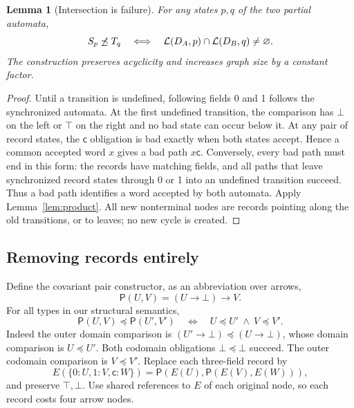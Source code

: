 \documentclass[11pt,letterpaper]{article}
\newtheorem{lemma}[theorem]{Lemma}
\theoremstyle{definition}\newtheorem{definition}[theorem]{Definition}
\newcommand{\Sub}{\ensuremath{\preceq}}
\newcommand{\rec}[1]{\{#1\}}
\newcommand{\checkfield}{\mathsf c}
\begin{document}
\begin{lemma}[Intersection is failure]\label{lem:encoding}
For any states $p,q$ of the two partial automata,
\[
 S_p\not\Sub T_q\quad\Longleftrightarrow\quad
 \mathcal L(D_A,p)\cap\mathcal L(D_B,q)\ne\varnothing.
\]
The construction preserves acyclicity and increases graph size by a constant factor.
\end{lemma}
\begin{proof}
Until a transition is undefined, following fields 0 and 1 follows the synchronized automata. At the first undefined transition, the comparison has $\bot$ on the left or $\top$ on the right and no bad state can occur below it. At any pair of record states, the $\checkfield$ obligation is bad exactly when both states accept. Hence a common accepted word $x$ gives a bad path $x\checkfield$. Conversely, every bad path must end in this form: the records have matching fields, and all paths that leave synchronized record states through 0 or 1 into an undefined transition succeed. Thus a bad path identifies a word accepted by both automata. Apply Lemma~\ref{lem:product}. All new nonterminal nodes are records pointing along the old transitions, or to leaves; no new cycle is created.
\end{proof}

\subsection{Removing records entirely}
Define the covariant pair constructor, as an abbreviation over arrows,
\[
 \mathsf P(U,V)=(U\to\bot)\to V.
\]
For all types in our structural semantics,
\begin{equation}\label{eq:pair}
 \mathsf P(U,V)\Sub\mathsf P(U',V')
 \quad\Longleftrightarrow\quad U\Sub U'\ \land\ V\Sub V'.
\end{equation}
Indeed the outer domain comparison is $(U'\to\bot)\Sub(U\to\bot)$, whose domain comparison is $U\Sub U'$. Both codomain obligations $\bot\Sub\bot$ succeed. The outer codomain comparison is $V\Sub V'$.
Replace each three-field record by
\[
 E(\rec{0:U,1:V,\checkfield:W})
 =\mathsf P(E(U),\mathsf P(E(V),E(W))),
\]
and preserve $\top,\bot$. Use shared references to $E$ of each original node, so each record costs four arrow nodes.
\end{document}
